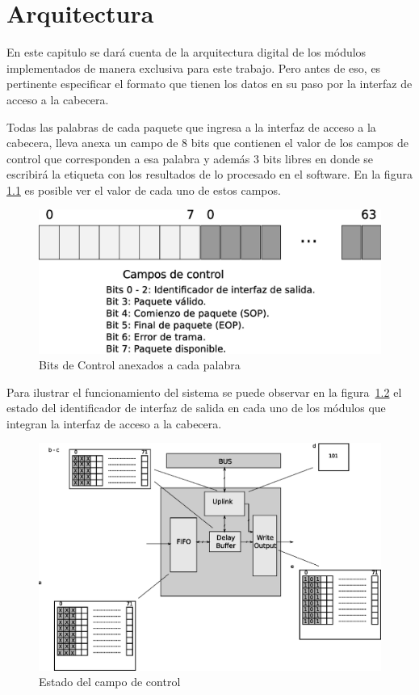 \chapter{Arquitectura}

En este capitulo se dará cuenta de la arquitectura digital de los módulos implementados de manera exclusiva para este trabajo. Pero antes de eso, es pertinente especificar el formato que tienen los datos en su paso por la interfaz de acceso a la cabecera.

Todas las palabras de cada paquete que ingresa a la interfaz de acceso a la cabecera, lleva anexa un campo de 8 bits que contienen el valor de los campos de control que corresponden a esa palabra y además 3 bits libres en donde se escribirá la etiqueta con los resultados de lo procesado en el software. En la figura \ref{fig:datocontrol}  es posible ver el valor de cada uno de estos campos.

\begin{figure}[H]
  \centering
	\includegraphics[scale=0.40]{3-arquitectura/graf/datocontrol.eps}
  \caption{Bits de Control anexados a cada palabra}
  \label{fig:datocontrol}
\end{figure}

Para ilustrar el funcionamiento del sistema se puede observar en la figura~\ref{fig:interfaz1} el estado del identificador de interfaz de salida en cada uno de los módulos que integran la interfaz de acceso a la cabecera.

\begin{figure}[H]
  \centering
	\includegraphics[scale=0.60]{3-arquitectura/graf/moduloexp.eps}
  \caption{Estado del campo de control}
  \label{fig:interfaz1}
\end{figure}

